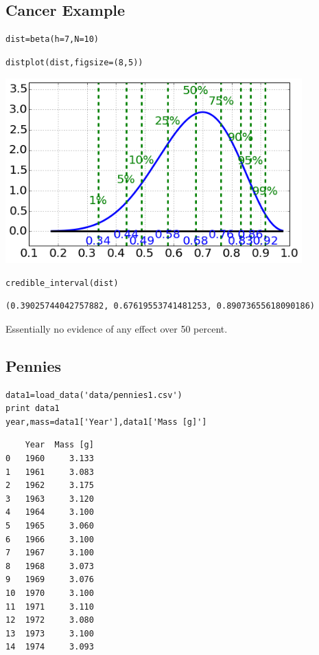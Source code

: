\subsection{Cancer Example}


\begin{lstlisting}
dist=beta(h=7,N=10)
\end{lstlisting}

\begin{lstlisting}
distplot(dist,figsize=(8,5))
\end{lstlisting}

\begin{center}\includegraphics[width=4.5in]{Applications_of_Parameter_Estimation/Applications_of_Parameter_Estimation_fig3.png}\end{center}

\begin{lstlisting}
credible_interval(dist)
\end{lstlisting}

\begin{verbatim}
(0.39025744042757882, 0.67619553741481253, 0.89073655618090186)
\end{verbatim}

Essentially no evidence of any effect over 50 percent.

\subsection{Pennies}


\begin{lstlisting}
data1=load_data('data/pennies1.csv')
print data1
year,mass=data1['Year'],data1['Mass [g]']
\end{lstlisting}

\begin{verbatim}
    Year  Mass [g]
0   1960     3.133
1   1961     3.083
2   1962     3.175
3   1963     3.120
4   1964     3.100
5   1965     3.060
6   1966     3.100
7   1967     3.100
8   1968     3.073
9   1969     3.076
10  1970     3.100
11  1971     3.110
12  1972     3.080
13  1973     3.100
14  1974     3.093
\end{verbatim}

